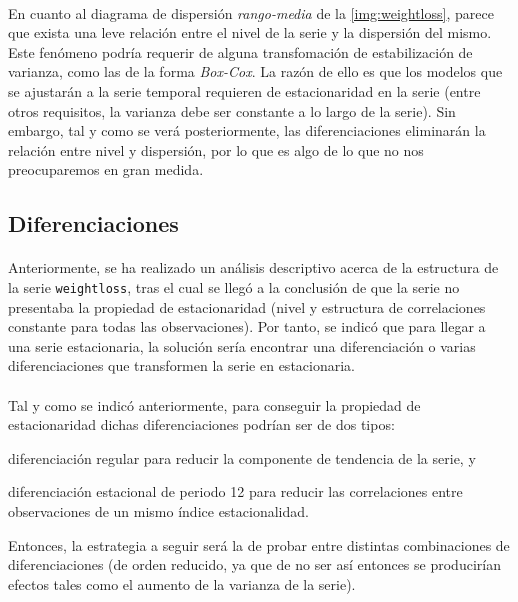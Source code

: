 \documentclass[a4paper, spanish]{article}
\begin{document}
      \paragraph{}
      En cuanto al diagrama de dispersión \emph{rango-media} de la \autoref{img:weightloss}, parece que exista una leve relación entre el nivel de la serie y la dispersión del mismo. Este fenómeno podría requerir de alguna transfomación de estabilización de varianza, como las de la forma \emph{Box-Cox}. La razón de ello es que los modelos que se ajustarán a la serie temporal requieren de estacionaridad en la serie (entre otros requisitos, la varianza debe ser constante a lo largo de la serie). Sin embargo, tal y como se verá posteriormente, las diferenciaciones eliminarán la relación entre nivel y dispersión, por lo que es algo de lo que no nos preocuparemos en gran medida.


    \subsection{Diferenciaciones}
    \label{sec:differences}

      \paragraph{}
      Anteriormente, se ha realizado un análisis descriptivo acerca de la estructura de la serie \texttt{weightloss}, tras el cual se llegó a la conclusión de que la serie no presentaba la propiedad de estacionaridad (nivel y estructura de correlaciones constante para todas las observaciones). Por tanto, se indicó que para llegar a una serie estacionaria, la solución sería encontrar una diferenciación o varias diferenciaciones que transformen la serie en estacionaria.

      \paragraph{}
      Tal y como se indicó anteriormente, para conseguir la propiedad de estacionaridad dichas diferenciaciones podrían ser de dos tipos: \begin{enumerate*}[label=(\arabic*)]
        \item diferenciación regular para reducir la componente de tendencia de la serie, y
        \item diferenciación estacional de periodo 12 para reducir las correlaciones entre observaciones de un mismo índice estacionalidad.
      \end{enumerate*} Entonces, la estrategia a seguir será la de probar entre distintas combinaciones de diferenciaciones (de orden reducido, ya que de no ser así entonces se producirían efectos tales como el aumento de la varianza de la serie).
\end{document}
